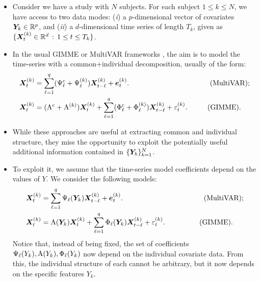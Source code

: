\begin{itemize}
	\item Consider we have a study with $N$ subjects. For each subject $1\leq k\leq N$, we have access to two data modes: (\textit{i}) a $p$-dimensional vector of covariates $\bm{Y}_k\in\mathbb{R}^{p}$, and (\textit{ii}) a $d$-dimensional time series of length $T_k$, given as $\{\bm{X}_t^{(k)}\in\mathbb{R}^{d} \,:\, 1\leq t\leq T_k\}$.
	
	\item In the usual GIMME or MultiVAR frameworks \citep{gates2012group,fisher2022penalized}, the aim is to model the time-series with a common+individual decomposition, usually of the form:
	\begin{align*}
		\bX^{(k)}_t &= \sum_{\ell=1}^{q} (\Psi_\ell^{c} + \Psi_\ell^{(k)}) \bX_{t-\ell}^{(k)} + \be^{(k)}_{t}.\hspace{40mm} \text{(MultiVAR)};\\
		\bX^{(k)}_t &= (\Ar^{c} + \Ar^{(k)}) \bX^{(k)}_t + \sum_{\ell=1}^{q} (\Phi_\ell^{c} + \Phi_\ell^{(k)}) \bX_{t-\ell}^{(k)} + \varepsilon^{(k)}_{t}.\hspace{10mm} \text{(GIMME)}.
	\end{align*}
	
	\item While these approaches are useful at extracting common and individual structure, they miss the opportunity to exploit the potentially useful additional information contained in $\{\bm{Y}_k\}_{k=1}^N$. 
	
	\item To exploit it, we assume that the time-series model coefficients depend on the values of $Y$. We consider the following models: 
	\begin{align}
		\bX^{(k)}_t &= \sum_{\ell=1}^{q} \Psi_\ell(\bY_k) \bX_{t-\ell}^{(k)} + \be^{(k)}_{t}.\hspace{40mm} \text{(MultiVAR)}; \label{eq:rvar}\\
		\bX^{(k)}_t &= \Ar(\bY_k) \bX^{(k)}_t + \sum_{\ell=1}^{q} \Phi_\ell(\bY_k) \bX_{t-\ell}^{(k)} + \varepsilon^{(k)}_{t}.\hspace{17mm} \text{(GIMME)}.
	\end{align}
	Notice that, instead of being fixed, the set of coefficients $\Psi_\ell(Y_k), \mathrm{A}(Y_k), \Phi_\ell(Y_k)$ now depend on the individual covariate data. From this, the individual structure of each cannot be arbitrary, but it now depends on the specific features $Y_k$.
	

\end{itemize}
